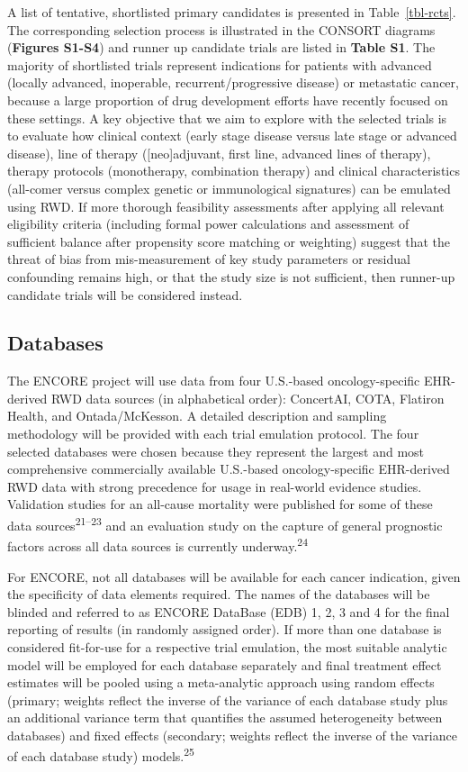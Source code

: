 \documentclass[
  letterpaper,
  DIV=11,
  numbers=noendperiod]{scrartcl}
\begin{document}
A list of tentative, shortlisted primary candidates is presented in
Table~\ref{tbl-rcts}. The corresponding selection process is illustrated
in the CONSORT diagrams (\textbf{Figures S1-S4}) and runner up candidate
trials are listed in \textbf{Table S1}. The majority of shortlisted
trials represent indications for patients with advanced (locally
advanced, inoperable, recurrent/progressive disease) or metastatic
cancer, because a large proportion of drug development efforts have
recently focused on these settings. A key objective that we aim to
explore with the selected trials is to evaluate how clinical context
(early stage disease versus late stage or advanced disease), line of
therapy ({[}neo{]}adjuvant, first line, advanced lines of therapy),
therapy protocols (monotherapy, combination therapy) and clinical
characteristics (all-comer versus complex genetic or immunological
signatures) can be emulated using RWD. If more thorough feasibility
assessments after applying all relevant eligibility criteria (including
formal power calculations and assessment of sufficient balance after
propensity score matching or weighting) suggest that the threat of bias
from mis-measurement of key study parameters or residual confounding
remains high, or that the study size is not sufficient, then runner-up
candidate trials will be considered instead.

\subsection{Databases}\label{databases}

The ENCORE project will use data from four U.S.-based oncology-specific
EHR-derived RWD data sources (in alphabetical order): ConcertAI, COTA,
Flatiron Health, and Ontada/McKesson. A detailed description and
sampling methodology will be provided with each trial emulation
protocol. The four selected databases were chosen because they represent
the largest and most comprehensive commercially available U.S.-based
oncology-specific EHR-derived RWD data with strong precedence for usage
in real-world evidence studies. Validation studies for an all-cause
mortality were published for some of these data
sources\textsuperscript{21--23} and an evaluation study on the capture
of general prognostic factors across all data sources is currently
underway.\textsuperscript{24}

For ENCORE, not all databases will be available for each cancer
indication, given the specificity of data elements required. The names
of the databases will be blinded and referred to as ENCORE DataBase
(EDB) 1, 2, 3 and 4 for the final reporting of results (in randomly
assigned order). If more than one database is considered fit-for-use for
a respective trial emulation, the most suitable analytic model will be
employed for each database separately and final treatment effect
estimates will be pooled using a meta-analytic approach using random
effects (primary; weights reflect the inverse of the variance of each
database study plus an additional variance term that quantifies the
assumed heterogeneity between databases) and fixed effects (secondary;
weights reflect the inverse of the variance of each database study)
models.\textsuperscript{25}
\end{document}
